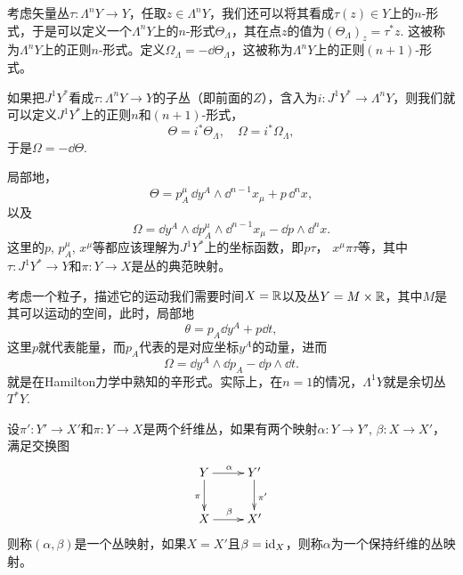 \begin{para}[正则形式]
   考虑矢量丛$\tau:\Lambda^n Y\to Y$，任取$z\in \Lambda^n Y$，我们还可以将其看成$\tau(z)\in Y$上的$n$-形式，于是可以定义一个$\Lambda^n Y$上的$n$-形式$\Theta_\Lambda$，其在点$z$的值为$(\Theta_\Lambda)_z=\tau^*z$. 这被称为$\Lambda^n Y$上的正则$n$-形式。定义$\Omega_\Lambda=-\dd \Theta_\Lambda$，这被称为$\Lambda^n Y$上的正则$(n+1)$-形式。

    如果把$J^1Y^*$看成$\tau:\Lambda^n Y\to Y$的子丛（即前面的$Z$），含入为$i:J^1Y^*\to \Lambda^n Y$，则我们就可以定义$J^1Y^*$上的正则$n$和$(n+1)$-形式，
    \[
        \Theta=i^*\Theta_\Lambda,\quad \Omega=i^*\Omega_\Lambda,
    \]
    于是$\Omega=-\dd \Theta$.
\end{para}

局部地，
\[
    \Theta=p_A^\mu\,\dd y^A\wedge \dd^{n-1}x_\mu + p\, \dd^n x,
\]
以及
\[
    \Omega=\dd y^A\wedge\dd p_A^\mu\wedge\dd ^{n-1}x_\mu-\dd p\wedge\dd^{n}x.
\]
这里的$p$, $p^\mu_A$, $x^\mu$等都应该理解为$J^1Y^*$上的坐标函数，即$p\tau$， $x^\mu\pi\tau$等，其中$\tau:J^1Y^*\to Y$和$\pi:Y\to X$是丛的典范映射。

\begin{para}[点粒子的例子]
    考虑一个粒子，描述它的运动我们需要时间$X=\mathbb{R}$以及丛$Y=M\times \mathbb{R}$，其中$M$是其可以运动的空间，此时，局部地
    \[
        \theta = p_A\dd y^A+p\dd t,
    \]
    这里$p$就代表能量，而$p_A$代表的是对应坐标$y^A$的动量，进而
    \[
        \Omega=\dd y^A\wedge\dd p_A-\dd p\wedge\dd t.
    \]
    就是在Hamilton力学中熟知的辛形式。实际上，在$n=1$的情况，$\Lambda^1Y$就是余切丛$T^*Y$.
\end{para}

\begin{para}[丛映射]
    设$\pi':Y'\to X'$和$\pi:Y\to X$是两个纤维丛，如果有两个映射$\alpha:Y\to Y'$, $\beta:X\to X'$，满足交换图
    \[
        \xymatrix{
            Y\ar[d]_\pi\ar[r]^\alpha&Y'\ar[d]^{\pi'}\\
            X\ar[r]^\beta&X'
        }
    \]
    则称$(\alpha,\beta)$是一个丛映射，如果$X=X'$且$\beta=\operatorname{id}_X$，则称$\alpha$为一个保持纤维的丛映射。
\end{para}

